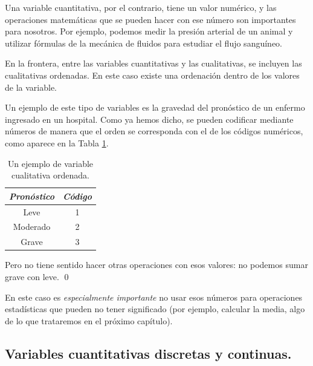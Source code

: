 Una {\sf variable cuantitativa},  por el
contrario,
	  tiene un valor numérico, y las operaciones matemáticas que se pueden
hacer con ese número son importantes para nosotros. Por ejemplo, podemos medir
la presión arterial de un animal y utilizar fórmulas de la mecánica de fluidos
para estudiar el flujo sanguíneo.

En la frontera, entre las variables cuantitativas y las cualitativas,
se incluyen las {\sf cualitativas ordenadas}. En este caso existe una ordenación dentro de los valores de la
variable.
\begin{ejemplo}
\label{cap01:ejem:VariableCualitativaOrdenada}
Un ejemplo de este tipo de variables es la gravedad del pronóstico de un enfermo ingresado en un
hospital. Como ya hemos dicho, se pueden codificar mediante números de manera que el orden se corresponda con el de los códigos numéricos, como aparece en la Tabla \ref{cap01:tabla:EjemploVariableCualitativaOrdenada}.
\begin{table}[h!]
        \begin{center}
        \begin{tabular}{|c|c|}
        \hline
        {\em Pronóstico}&{\em Código}\\
        \hline
        Leve&1\\
        \hline
        Moderado&2\\
        \hline
        Grave&3\\
        \hline
        \end{tabular}
        \end{center}
\caption{Un ejemplo de variable cualitativa ordenada.}
\label{cap01:tabla:EjemploVariableCualitativaOrdenada}
\end{table}

Pero no tiene sentido hacer otras operaciones con esos valores: no
podemos sumar grave con leve.
\qed
\end{ejemplo}

En este caso es {\em especialmente importante} no usar esos números para
operaciones estadísticas que pueden no tener significado (por ejemplo, calcular
la media, algo de lo que trataremos en el próximo capítulo).


\subsection{Variables cuantitativas discretas y continuas.}
\label{cap01:subsec:VariablesCuantDiscretasContinuas}



